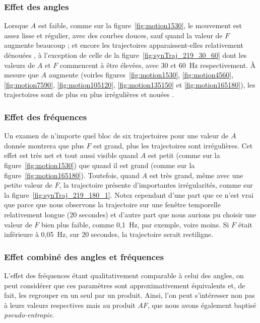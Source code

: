 	\subsubsection{Effet des angles}
	Lorsque $A$ est faible, comme sur la figure~\ref{fig:motion1530}, le mouvement est assez lisse et régulier, avec des courbes douces, sauf quand la valeur de $F$ augmente beaucoup ; et encore les trajectoires apparaissent-elles relativement \og dénouées \fg{}, à l'exception de celle de la figure~\ref{fig:synTraj_219_30_60} dont les valeurs de $A$ et $F$ commencent à être élevées, avec 30\textdegree{} et 60~Hz respectivement. À mesure que $A$ augmente (voirles figures~\ref{fig:motion1530}, \ref{fig:motion4560}, \ref{fig:motion7590}, \ref{fig:motion105120}, \ref{fig:motion135150} et \ref{fig:motion165180}), les trajectoires sont de plus en plus irrégulières et \og nouées \fg{}.
	
	\subsubsection{Effet des fréquences}
	Un examen de n'importe quel bloc de six trajectoires pour une valeur de $A$ donnée montrera que plus $F$ est grand, plus les trajectoires sont irrégulières. Cet effet est très net et tout aussi visible quand $A$ est petit (comme sur la figure~\ref{fig:motion1530}) que quand il est grand (comme sur la figure~\ref{fig:motion165180}). Toutefois, quand $A$ est très grand, même avec une petite valeur de $F$, la trajectoire présente d'importantes irrégularités, comme sur la figure~\ref{fig:synTraj_219_180_1}. Notez cependant d'une part que ce n'est vrai que parce que nous observons la trajectoire sur une fenêtre temporelle relativement longue (20 secondes) et d'autre part que nous aurions pu choisir une valeur de $F$ bien plus faible, comme 0,1~Hz, par exemple, voire moins. Si $F$ était inférieure à 0,05~Hz, sur 20 secondes, la trajectoire serait rectiligne.
	
	\subsubsection{Effet combiné des angles et fréquences}
	L'effet des fréquences étant qualitativement comparable à celui des angles, on peut considérer que ces paramètres sont approximativement équivalents et, de fait, les regrouper en un seul par un produit. Ainsi, l'on peut s'intéresser non pas à leurs valeurs respectives mais au produit $AF$, que nous avons également baptisé \emph{pseudo-entropie}.
	

